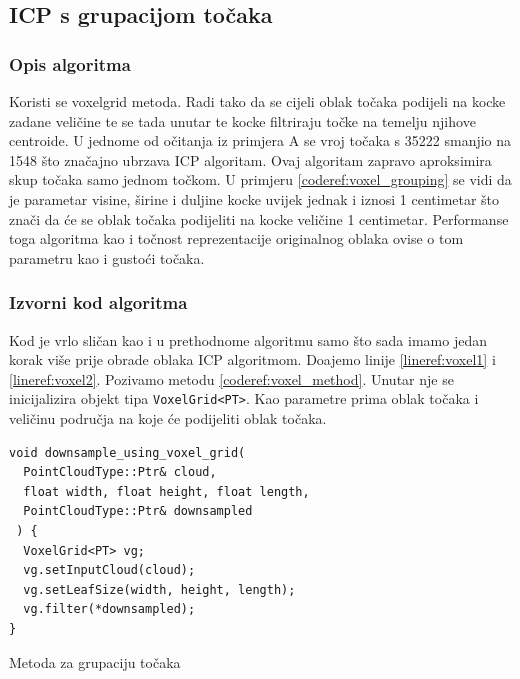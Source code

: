 \subsection{ICP s grupacijom točaka}

\subsubsection{Opis algoritma}
Koristi se voxelgrid\cite{pcl:voxelgrid} metoda. Radi tako da se cijeli oblak točaka podijeli na kocke zadane veličine te se tada unutar te kocke filtriraju točke na temelju njihove centroide. U jednome od očitanja iz primjera A se vroj točaka s 35222 smanjio na 1548 što značajno ubrzava ICP algoritam. Ovaj algoritam zapravo aproksimira skup točaka samo jednom točkom. U primjeru \ref{coderef:voxel_grouping} se vidi da je parametar visine, širine i duljine kocke uvijek jednak i iznosi 1 centimetar što znači da će se oblak točaka podijeliti na kocke veličine 1 centimetar. Performanse toga algoritma kao i točnost reprezentacije originalnog oblaka ovise o tom parametru kao i gustoći točaka.


\subsubsection{Izvorni kod algoritma}
Kod je vrlo sličan kao i u prethodnome algoritmu samo što sada imamo jedan korak više prije obrade oblaka ICP algoritmom. Doajemo linije \ref{lineref:voxel1} i \ref{lineref:voxel2}. Pozivamo metodu \ref{coderef:voxel_method}. Unutar nje se inicijalizira objekt tipa \texttt{VoxelGrid<PT>}. Kao parametre prima oblak točaka i veličinu područja na koje će podijeliti oblak točaka.

\begin{listing}[H]
  \begin{verbatim}
void downsample_using_voxel_grid(
  PointCloudType::Ptr& cloud,
  float width, float height, float length,
  PointCloudType::Ptr& downsampled
 ) {
  VoxelGrid<PT> vg;
  vg.setInputCloud(cloud);
  vg.setLeafSize(width, height, length);
  vg.filter(*downsampled);
}
  \end{verbatim}
  \caption{Metoda za grupaciju točaka}
  \label{coderef:voxel_method}
\end{listing}

